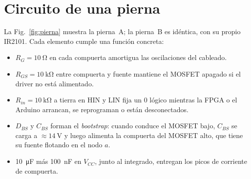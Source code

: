 \documentclass[10pt,twocolumn,letterpaper]{article}
\begin{document}
\section{Circuito de una pierna}
La Fig.~\ref{fig:pierna} muestra la pierna~A; la pierna~B es idéntica, con su propio IR2101. Cada elemento cumple una función concreta:
\begin{itemize}[leftmargin=*]
\item $R_G=\SI{10}{\ohm}$ en cada compuerta amortigua las oscilaciones del cableado.
\item $R_{GS}=\SI{10}{\kilo\ohm}$ entre compuerta y fuente mantiene el MOSFET apagado si el driver no está alimentado.
\item $R_{in}=\SI{10}{\kilo\ohm}$ a tierra en HIN y LIN fija un 0 lógico mientras la FPGA o el Arduino arrancan, se reprograman o están desconectados.
\item $D_{BS}$ y $C_{BS}$ forman el \emph{bootstrap}: cuando conduce el MOSFET bajo, $C_{BS}$ se carga a $\approx\SI{14}{\volt}$ y luego alimenta la compuerta del MOSFET alto, que tiene su fuente flotando en el nodo $a$.
\item \SI{10}{\micro\farad} más \SI{100}{\nano\farad} en $V_{CC}$, junto al integrado, entregan los picos de corriente de compuerta.
\end{itemize}
\end{document}
